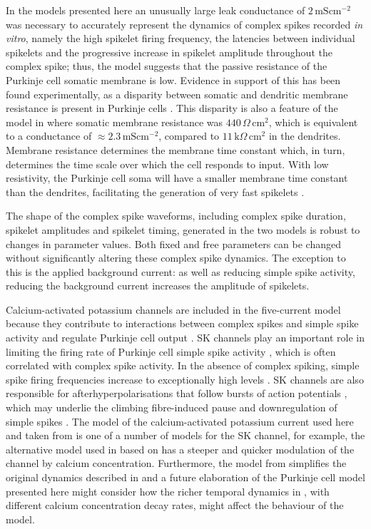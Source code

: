 \documentclass[twocolumn]{svjour3}          %
\newcommand{\msi}{\,\mathrm{mS cm^{-2}}}
\begin{document}
In the models presented here an unusually large leak conductance of
$2\msi$ was necessary to accurately represent the dynamics of complex
spikes recorded \textit{in vitro}, namely the high spikelet firing
frequency, the latencies between individual spikelets and the
progressive increase in spikelet amplitude throughout the complex
spike; thus, the model suggests that the passive resistance of the
Purkinje cell somatic membrane is low. Evidence in support of this has
been found experimentally, as a disparity between somatic and
dendritic membrane resistance is present in Purkinje cells
\citep{RappEtAl1994}. This disparity is also a feature of the model in
\citet{DeSchutterBower1994a,DeSchutterBower1994b,DeSchutterBower1994c}
where somatic membrane resistance was $440\,\Omega\,\mathrm{cm}^2$,
which is equivalent to a conductance of $\approx 2.3\msi$, compared to
$11\,\mathrm{k}\Omega\,\mathrm{cm}^2$ in the dendrites. Membrane
resistance determines the membrane time constant which, in turn,
determines the time scale over which the cell responds to input. With
low resistivity, the Purkinje cell soma will have a smaller membrane
time constant than the dendrites, facilitating the generation of very
fast spikelets \citep{WarnaarEtAl2015}.

The shape of the complex spike waveforms, including complex spike
duration, spikelet amplitudes and spikelet timing, generated in the
two models is robust to changes in parameter values. Both fixed and
free parameters can be changed without significantly altering these
complex spike dynamics. The exception to this is the applied
background current: as well as reducing simple spike activity,
reducing the background current increases the amplitude of spikelets.

Calcium-activated potassium channels are included in the five-current
model because they contribute to interactions between complex spikes
and simple spike activity and regulate Purkinje cell output
\citep{TankEtAl1988,McKayEtAl2007}. SK channels play an important role
in limiting the firing rate of Purkinje cell simple spike activity
\citep{WomackEtAl2003,EgorovaEtAl2014}, which is often
correlated with complex spike activity. In the absence of complex
spiking, simple spike firing frequencies increase to exceptionally
high levels \citep{CerminaraRawson2004}. SK channels are also
responsible for afterhyperpolarisations that follow bursts of action
potentials \citep{HosyEtAl2011}, which may underlie the climbing
fibre-induced pause and downregulation of simple spikes
\citep{Xian-HuaEtAl2017}. The model of the calcium-activated potassium
current used here and taken from \citet{GilliesWillshaw2006} is one of
a number of models for the SK channel, for example, the alternative
model used in \citet{GriffithEtAl2016} based on
\citet{ChayKeizer1983,XiaEtAl1998} has a steeper and quicker modulation
of the channel by calcium concentration. Furthermore, the model from
\citet{GilliesWillshaw2006} simplifies the original dynamics described
in \citet{HirschbergEtAl1998} and a future elaboration of the Purkinje
cell model presented here might consider how the richer temporal
dynamics in \citet{HirschbergEtAl1998}, with different calcium
concentration decay rates, might affect the behaviour of the model.
\end{document}
